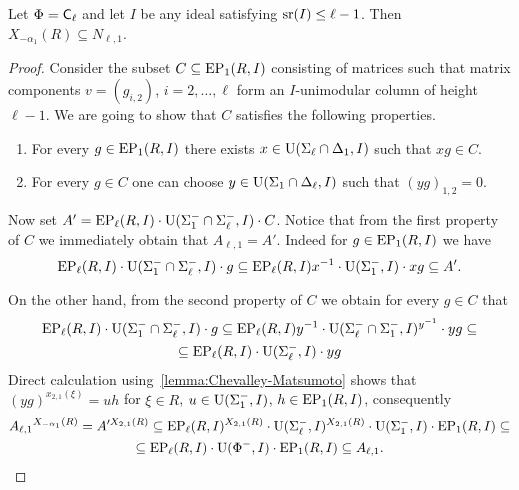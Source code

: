 \begin{lemma} \label{lemma:DVcaseCl}
Let $\Phi=\mathsf{C}_\ell$ and let $I$ be any ideal satisfying $\operatorname{sr}(I) \leq \ell-1$. Then $X_{-\alpha_1}(R) \subseteq N_{\ell, 1}$.
\end{lemma}
\begin{proof}
Consider the subset $C \subseteq \operatorname{EP}_1(R, I)$ consisting of matrices such that matrix components $v=(g_{i,2})$, $i=2,\ldots, \ell$ form an $I$-unimodular column of height $\ell-1$.
We are going to show that $C$ satisfies the following properties.
 \begin{enumerate}
  \item \label{item-dvc1} For every $g \in \operatorname{EP}_1(R, I)$ there exists $x \in \operatorname{U}(\Sigma_\ell \cap \Delta_1, I)$ such that $xg \in C$.  
  \item \label{item-dvc2} For every $g \in C$ one can choose $y \in \operatorname{U}(\Sigma_1 \cap \Delta_\ell, I)$ such that $(y g)_{1,2} = 0$.
 \end{enumerate}
 
Now set $A' = \operatorname{EP}_\ell(R, I) \cdot \operatorname{U}(\Sigma_1^- \cap \Sigma_\ell^-, I) \cdot C$.
Notice that from the first property of $C$ we immediately obtain that $A_{\ell, 1} = A'$.
Indeed for $g\in \operatorname{EP}_1(R, I)$ we have
\begin{equation} \operatorname{EP}_\ell(R, I) \cdot \operatorname{U}(\Sigma_1^- \cap \Sigma_\ell^-, I) \cdot g \subseteq 
 \operatorname{EP}_\ell(R, I)x^{-1}  \cdot \operatorname{U}(\Sigma_1^-, I) \cdot xg \subseteq A'. \end{equation}

On the other hand, from the second property of $C$ we obtain for every $g\in C$ that
\begin{multline*}
 \operatorname{EP}_\ell(R, I) \cdot \operatorname{U}(\Sigma_1^- \cap \Sigma_\ell^-, I) \cdot g \subseteq \operatorname{EP}_\ell(R, I) y^{-1} \cdot \operatorname{U}(\Sigma_\ell^-\cap \Sigma_1^-, I)^{y^{-1}} \cdot y g \subseteq \\
  \subseteq \operatorname{EP}_\ell(R, I) \cdot \operatorname{U}(\Sigma_\ell^-, I) \cdot y g
\end{multline*}
Direct calculation using~\cref{lemma:Chevalley-Matsumoto} shows that $(yg)^{x_{2,1}(\xi)} = u h$ for $\xi \in R$, $u \in \operatorname{U}(\Sigma_1^-, I)$, $h \in \operatorname{EP}_1(R, I)$, consequently
\begin{multline*} {A_{\ell,1}}^{X_{-\alpha_1}(R)} = A'^{X_{2,1}(R)} \subseteq \operatorname{EP}_\ell(R, I)^{X_{2,1}(R)} \cdot \operatorname{U}(\Sigma_\ell^-, I)^{X_{2,1}(R)} \cdot \operatorname{U}(\Sigma_1^-, I) \cdot \operatorname{EP}_1(R, I) \subseteq \\
 \subseteq \operatorname{EP}_\ell(R, I) \cdot \operatorname{U}(\Phi^-, I) \cdot \operatorname{EP}_1(R, I) \subseteq A_{\ell,1}. \end{multline*}
\end{proof}